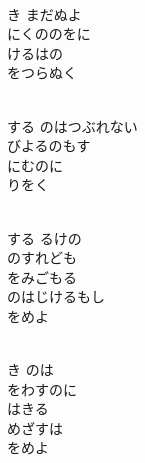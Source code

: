\documentclass[10pt,b5j]{tarticle} %
\begin{document}
\vspace{1.5em} %
\newcommand{\linespace}{0.5em} %
\newcommand{\blocksize}{0.5\hsize} %
\newcommand{\itemmargin}{6em} %
\begin{enumerate} %
    \setlength{\itemindent}{\itemmargin} %
    \begin{minipage}[c]{\blocksize}
    
        \vspace{\linespace}
        \item~\\
        き まだぬよ\\
        にくののをに\\
        けるはの\\
        をつらぬく
        
        \vspace{\linespace}
        \item~\\
        する のはつぶれない\\
        びよるのもす\\
        にむのに\\
        りをく
        
        \vspace{\linespace}
        \item~\\
        する るけの\\
        のすれども\\
        をみごもる\\
        のはじけるもし\\
        をめよ
        
        \vspace{\linespace}
        \item~\\
        き のは\\
        をわすのに\\
        はきる\\
        めざすは\\
        をめよ
    
    \end{minipage}
\end{enumerate} %
\end{document}
